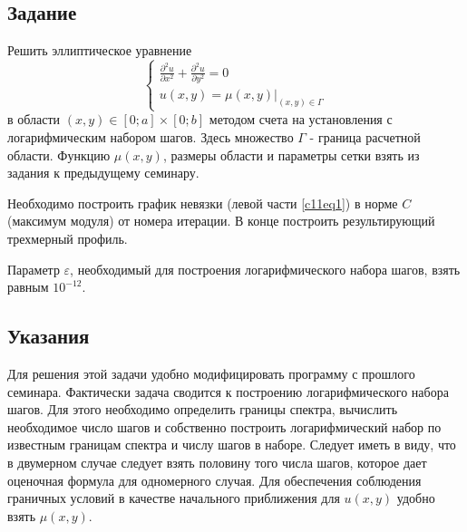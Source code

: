 \chapter{}

\section{Задание}
Решить эллиптическое уравнение 
\begin{equation} \label{c11eq1}
	\begin{cases}
		\displaystyle \frac{\partial^2 u}{\partial x^2} + \frac{\partial^2 u}{\partial y^2} = 0 \\
		u(x,y) = \left. \mu(x,y) \right|_{(x,y) \in \Gamma}
	\end{cases}
\end{equation}
в области $(x,y) \in [0; a] \times [0; b]$ методом счета на установления с логарифмическим набором шагов. Здесь множество $\Gamma$ - граница расчетной области. Функцию $\mu(x,y)$, размеры области и параметры сетки взять из задания к предыдущему семинару.

Необходимо построить график невязки (левой части \eqref{c11eq1}) в норме $C$ (максимум модуля) 
от номера итерации. В конце построить результирующий трехмерный профиль.

Параметр $\varepsilon$, необходимый для построения логарифмического набора шагов, взять равным $10^{-12}$.

\section{Указания}
Для решения этой задачи удобно модифицировать программу с прошлого семинара. Фактически задача сводится к построению логарифмического набора шагов. Для этого необходимо определить границы спектра, вычислить необходимое число шагов и собственно построить логарифмический набор по известным границам спектра и числу шагов в наборе. Следует иметь в виду, что в двумерном случае следует взять половину того числа шагов, которое дает оценочная формула для одномерного случая. Для обеспечения соблюдения граничных условий в качестве начального приближения для $u(x,y)$ удобно взять $\mu(x,y)$.


